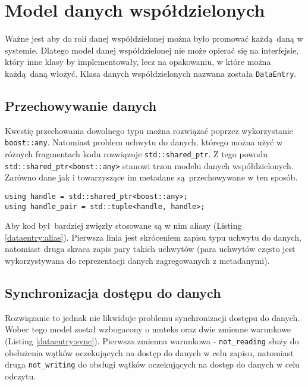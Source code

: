 \section{Model danych współdzielonych}
Ważne jest aby do roli danej współdzielonej można było promować każdą daną w systemie. Dlatego model danej współdzielonej nie może opierać się na interfejsie, który inne klasy by implementowały, lecz na opakowaniu, w które można każdą daną włożyć. Klasa danych współdzielonych nazwana została \lstinline$DataEntry$.

\subsection{Przechowywanie danych}
Kwestię przechowania dowolnego typu można rozwiązać poprzez wykorzystanie \lstinline$boost::any$. Natomiast problem uchwytu do danych, którego można użyć w różnych fragmentach kodu rozwiązuje \lstinline$std::shared_ptr$. Z tego powodu \lstinline$std::shared_ptr<boost::any>$ stanowi trzon modelu danych współdzielonych. Zarówno dane jak i towarzyszące im metadane są przechowywane w ten sposób. 
 
\begin{minipage}{\textwidth}
	\begin{lstlisting}[label=dataentry:alias, caption={Aliasy używane w kodzie aplikacji},alsoletter={()[].=}]
using handle = std::shared_ptr<boost::any>;
using handle_pair = std::tuple<handle, handle>;
	\end{lstlisting}
\end{minipage}

Aby kod był bardziej zwięzły stosowane są w nim aliasy (Listing \ref{dataentry:alias}). Pierwsza linia jest skróceniem zapisu typu uchwytu do danych, natomiast druga skraca zapis pary takich uchwytów (para uchwytów często jest wykorzystywana do reprezentacji danych zagregowanych z metadanymi).

\subsection{Synchronizacja dostępu do danych}
Rozwiązanie to jednak nie likwiduje problemu synchronizacji dostępu do danych. Wobec tego model został wzbogacony o muteks oraz dwie zmienne warunkowe (Listing \ref{dataentry:sync}). Pierwsza zmienna warunkowa - \lstinline$not_reading$ służy do obsłużenia wątków oczekujących na dostęp do danych w celu zapisu, natomiast druga \lstinline$not_writing$ do obsługi wątków oczekujących na dostęp do danych w celu odczytu.

